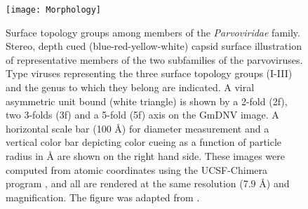 \begin{figure}[h] 
\centering
\texttt{[image: Morphology]}
\caption[Parvovirus surface topology groups]{Surface topology groups among members of the \textit{Parvoviridae} family. Stereo, depth cued (blue-red-yellow-white) capsid surface illustration of representative members of the two subfamilies of the parvoviruses. Type viruses representing the three surface topology groups (I-III) and the genus to which they belong are indicated. A viral asymmetric unit bound (white triangle) is shown by a 2-fold (2f), two 3-folds (3f) and a 5-fold (5f) axis on the GmDNV image. A horizontal scale bar (100 \r{A}) for diameter measurement and a vertical color bar depicting color cueing as a function of particle radius in \r{A} are shown on the right hand side. These images were computed from atomic coordinates using the UCSF-Chimera program \cite{pmid15264254}, and all are rendered at the same resolution (7.9 \r{A}) and magnification. The figure was adapted from \cite{pmid20375175}.}
\label{Morphology}
\end{figure}





